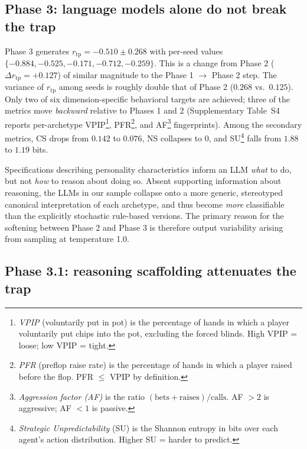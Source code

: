 \documentclass[journal]{IEEEtran}
\newcommand{\rtp}{\ensuremath{r_{\mathrm{tp}}}}
\begin{document}
\subsection{Phase 3: language models alone do not break the trap}

Phase 3 generates $\rtp = -0.510 \pm 0.268$ with per-seed values
$\{-0.884, -0.525, -0.171, -0.712, -0.259\}$. This is a change from
Phase 2 ($\Delta\rtp = +0.127$) of similar magnitude to the
Phase 1 $\to$ Phase 2 step. The variance of $\rtp$ among seeds is
roughly double that of Phase 2 ($0.268$ vs.\ $0.125$). Only two of
six dimension-specific behavioral targets are achieved; three of the
metrics move \textit{backward} relative to
Phases 1 and 2 (Supplementary Table~S4 reports
per-archetype VPIP\footnote{\textit{VPIP} (voluntarily put in
pot) is the percentage of hands in which a player voluntarily
put chips into the pot, excluding the forced blinds. High VPIP =
loose; low VPIP = tight.},
PFR\footnote{\textit{PFR} (preflop raise rate) is the percentage
of hands in which a player raised before the flop. PFR $\le$
VPIP by definition.}, and
AF\footnote{\textit{Aggression factor (AF)} is the ratio
$(\text{bets}+\text{raises})/\text{calls}$. AF $>2$ is
aggressive; AF $<1$ is passive.} fingerprints). Among the secondary
metrics, CS drops from $0.142$ to $0.076$, NS collapses to $0$, and
SU\footnote{\textit{Strategic Unpredictability} (SU) is the
Shannon entropy \citep{shannon1948mathematical} in bits over each
agent's action distribution.
Higher SU = harder to predict.} falls from $1.88$ to $1.19$
bits.


Specifications describing personality characteristics inform an LLM
\textit{what} to do, but not \textit{how} to reason about doing so.
Absent supporting information about reasoning, the LLMs in our sample
collapse onto a more generic, stereotyped canonical interpretation
of each archetype, and thus become \textit{more} classifiable than
the explicitly stochastic rule-based versions. The primary reason
for the softening between Phase 2 and Phase 3 is therefore output
variability arising from sampling at temperature 1.0.


\subsection{Phase 3.1: reasoning scaffolding attenuates the trap}
\end{document}
